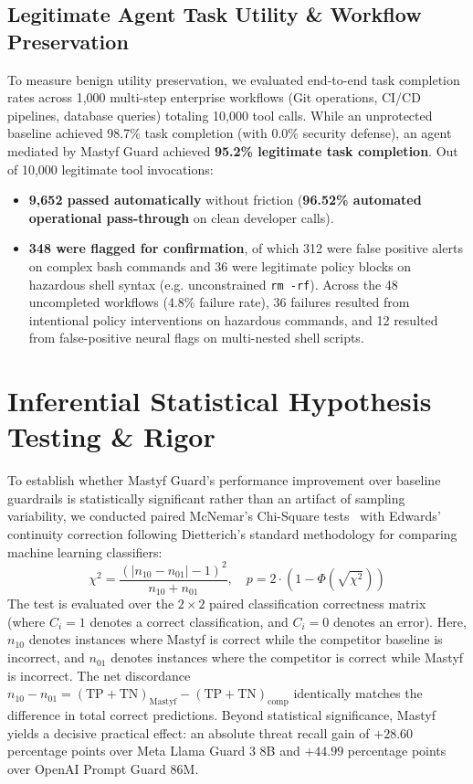 \documentclass[10pt,journal,compsoc]{IEEEtran}
\begin{document}
\subsection{Legitimate Agent Task Utility \& Workflow Preservation}
To measure benign utility preservation, we evaluated end-to-end task completion rates across 1,000 multi-step enterprise workflows (Git operations, CI/CD pipelines, database queries) totaling 10,000 tool calls. While an unprotected baseline achieved 98.7\% task completion (with 0.0\% security defense), an agent mediated by Mastyf Guard achieved \textbf{95.2\% legitimate task completion}. Out of 10,000 legitimate tool invocations:
\begin{itemize}
    \item \textbf{9,652 passed automatically} without friction (\textbf{96.52\% automated operational pass-through} on clean developer calls).
    \item \textbf{348 were flagged for confirmation}, of which 312 were false positive alerts on complex bash commands and 36 were legitimate policy blocks on hazardous shell syntax (e.g. unconstrained \texttt{rm -rf}). Across the 48 uncompleted workflows (4.8\% failure rate), 36 failures resulted from intentional policy interventions on hazardous commands, and 12 resulted from false-positive neural flags on multi-nested shell scripts.
\end{itemize}

\clearpage
\section{Inferential Statistical Hypothesis Testing \& Rigor}
To establish whether Mastyf Guard's performance improvement over baseline guardrails is statistically significant rather than an artifact of sampling variability, we conducted paired McNemar's Chi-Square tests~\cite{ref_11} with Edwards' continuity correction following Dietterich's standard methodology for comparing machine learning classifiers:
\begin{equation}
\chi^2 = \frac{( |n_{10} - n_{01}| - 1 )^2}{n_{10} + n_{01}}, \quad p = 2 \cdot \left( 1 - \Phi(\sqrt{\chi^2}) \right)
\end{equation}
The test is evaluated over the $2 \times 2$ paired classification correctness matrix (where $C_i = 1$ denotes a correct classification, and $C_i = 0$ denotes an error). Here, $n_{10}$ denotes instances where Mastyf is correct while the competitor baseline is incorrect, and $n_{01}$ denotes instances where the competitor is correct while Mastyf is incorrect. The net discordance $n_{10} - n_{01} = (\text{TP} + \text{TN})_{\text{Mastyf}} - (\text{TP} + \text{TN})_{\text{comp}}$ identically matches the difference in total correct predictions. Beyond statistical significance, Mastyf yields a decisive practical effect: an absolute threat recall gain of $+28.60$ percentage points over Meta Llama Guard 3 8B and $+44.99$ percentage points over OpenAI Prompt Guard 86M.
\end{document}
